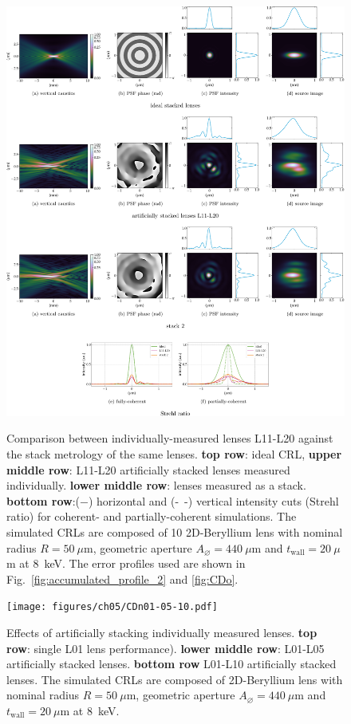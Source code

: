 \begin{refsection}
\begin{figure}[t]
        \centering
        {\includegraphics[width=1\linewidth]{figures/ch05/CDo_vs_CDoStack.pdf}}
        \caption[Artificially stacked lenses L11-L21 vs. stack 2 comparison]{Comparison between individually-measured lenses L11-L20 against the stack metrology of the same lenses. \textbf{top row}: ideal CRL, \textbf{upper middle row}: L11-L20 artificially stacked lenses measured individually. \textbf{lower middle row}: lenses measured as a stack. \textbf{bottom row}:($-$) horizontal and (-~-) vertical intensity cuts (Strehl ratio) for coherent- and partially-coherent simulations. The simulated CRLs are composed of 10 2D-Beryllium lens with nominal radius $R=50~\mu\text{m}$, geometric aperture $A_{\diameter}=440~\mu\text{m}$ and $t_\text{wall}=20~\mu$m at 8~keV. The error profiles used are shown in Fig.~\ref{fig:accumulated_profile_2} and \ref{fig:CDo}.}\label{fig:CDo_vs_CDoStack}
\end{figure}

\begin{figure}[t]
        \centering
        {\texttt{[image: figures/ch05/CDn01-05-10.pdf]}}
        \caption[Effects of stacking lenses]{Effects of artificially stacking individually measured lenses. \textbf{top row}: single L01 lens performance). \textbf{lower middle row}: L01-L05 artificially stacked lenses. \textbf{bottom row} L01-L10 artificially stacked lenses. The simulated CRLs are composed of 2D-Beryllium lens with nominal radius $R=50~\mu\text{m}$, geometric aperture $A_{\diameter}=440~\mu\text{m}$ and $t_\text{wall}=20~\mu$m at 8~keV.}\label{fig:CDn01-05-10}
\end{figure}


\end{refsection}
